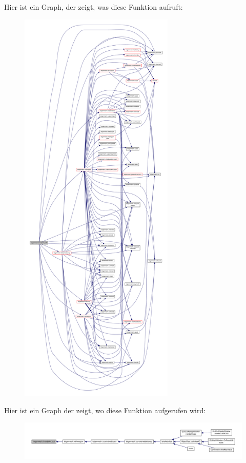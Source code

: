 Hier ist ein Graph, der zeigt, was diese Funktion aufruft\-:\nopagebreak
\begin{figure}[H]
\begin{center}
\leavevmode
\includegraphics[height=550pt]{classtetgenmesh_a9c967ef25cfd6e06d6b9301302be3f70_cgraph}
\end{center}
\end{figure}




Hier ist ein Graph der zeigt, wo diese Funktion aufgerufen wird\-:\nopagebreak
\begin{figure}[H]
\begin{center}
\leavevmode
\includegraphics[width=350pt]{classtetgenmesh_a9c967ef25cfd6e06d6b9301302be3f70_icgraph}
\end{center}
\end{figure}


